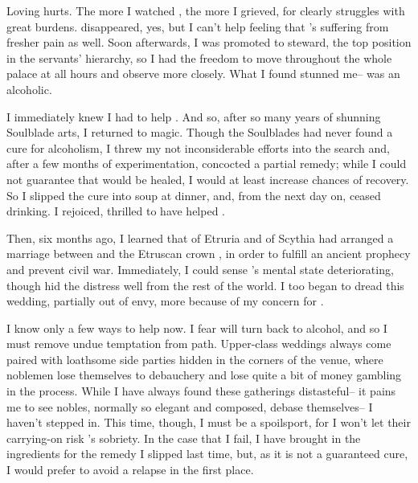 \documentclass[char]{Kos}
\begin{document}
Loving \cBride{\them} hurts. The more I watched \cBride{\them}, the more I grieved, for \cBride{\they} clearly struggles with great burdens. \cBride{\Their} \cFugitive{\sibling} disappeared, yes, but I can't help feeling that \cBride{}'s suffering from fresher pain as well. Soon afterwards, I was promoted to steward, the top position in the servants' hierarchy, so I had the freedom to move throughout the whole palace at all hours and observe \cBride{\them} more closely. What I found stunned me-- \cBride{\they} was an alcoholic.

I immediately knew I had to help \cBride{\them}. And so, after so many years of shunning Soulblade arts, I returned to magic. Though the Soulblades had never found a cure for alcoholism, I threw my not inconsiderable efforts into the search and, after a few months of experimentation, concocted a partial remedy; while I could not guarantee that \cBride{\they} would be healed, I would at least increase \cBride{\their} chances of recovery. So I slipped the cure into \cBride{\their} soup at dinner, and, from the next day on, \cBride{\they} ceased drinking. I rejoiced, thrilled to have helped \cBride{\them}.

Then, six months ago, I learned that \cEtruriaKing{\Monarch} \cEtruriaKing{} of Etruria and \cScythiaKing{\Monarch} \cScythiaKing{} of Scythia had arranged a marriage between \cBride{} and the Etruscan crown \cGroom{\prince} \cGroom{}, in order to fulfill an ancient prophecy and prevent civil war. Immediately, I could sense \cBride{}'s mental state deteriorating, though \cBride{\they} hid the distress well from the rest of the world. I too began to dread this wedding, partially out of envy, more because of my concern for \cBride{\them}.

I know only a few ways to help \cBride{\them} now. I fear \cBride{\they} will turn back to alcohol, and so I must remove undue temptation from \cBride{\their} path. Upper-class weddings always come paired with loathsome side parties hidden in the corners of the venue, where noblemen lose themselves to debauchery and lose quite a bit of money gambling in the process. While I have always found these gatherings distasteful-- it pains me to see nobles, normally so elegant and composed, debase themselves-- I haven't stepped in. This time, though, I must be a spoilsport, for I won't let their carrying-on risk \cBride{}'s sobriety. In the case that I fail, I have brought in the ingredients for the remedy I slipped \cBride{\them} last time, but, as it is not a guaranteed cure, I would prefer to avoid a relapse in the first place.
\end{document}
